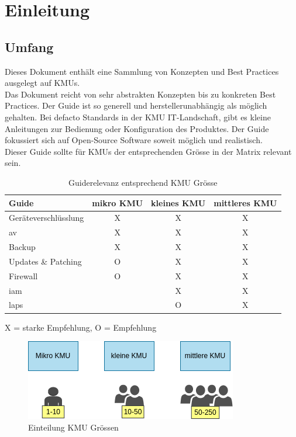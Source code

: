 \chapter{Einleitung}
\section{Umfang}
Dieses Dokument enthält eine Sammlung von Konzepten und Best Practices ausgelegt auf KMUs.\\

Das Dokument reicht von sehr abstrakten Konzepten bis zu konkreten Best Practices.
Der Guide ist so generell und herstellerunabhängig als möglich gehalten.
Bei defacto Standards in der KMU IT-Landschaft, gibt es kleine Anleitungen zur Bedienung oder Konfiguration des Produktes.
Der Guide fokussiert sich auf Open-Source Software soweit möglich und realistisch.\\

Dieser Guide sollte für KMUs der entsprechenden Grösse in der Matrix relevant sein.

\begin{table}[H]
    \begin{center}
        \begin{tabular}{l|c|c|c}
            Guide                & mikro KMU & kleines KMU & mittleres KMU\\
            \hline
            Geräteverschlüsslung & X         & X             & X\\
            \acrlong{av}         & X         & X             & X\\
            Backup               & X         & X             & X\\
            Updates \& Patching  & O         & X             & X\\
            Firewall             & O         & X             & X\\
            \acrfull{iam}        &           & X             & X\\
            \acrfull{laps}       &           & O             & X\\
        \end{tabular}
        \caption*{X = starke Empfehlung, O = Empfehlung}
    \end{center}
    \caption{Guiderelevanz entsprechend KMU Grösse}
\end{table}

\begin{figure}[H]
    \centering
    \includegraphics[width=0.6\linewidth]{../img/kmu.png}
    \caption{Einteilung KMU Grössen}
\end{figure}

